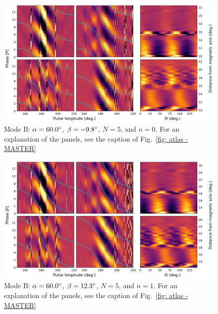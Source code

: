 \begin{figure}
	\begin{center}
		\includegraphics[width=\atlasHeightFrac\textwidth]{Figures/B0031/atlas/B_517060005000_plots}
		\caption[Atlas results: Mode B -- $\alpha=60.0\degr$, $\beta=-9.8\degr$, $N=5$, $n=0$]{Mode B: $\alpha=60.0\degr$, $\beta=-9.8\degr$, $N=5$, and $n=0$. For an explanation of the panels, see the caption of Fig.~\ref{fig: atlas - MASTER} }
		\label{fig: atlas - B_517060005000}
	\end{center}
\end{figure}

\begin{figure}
	\begin{center}
		\includegraphics[width=\atlasHeightFrac\textwidth]{Figures/B0031/atlas/B_517060005001_plots}
		\caption[Atlas results: Mode B -- $\alpha=60.0\degr$, $\beta=12.3\degr$, $N=5$, $n=1$]{Mode B: $\alpha=60.0\degr$, $\beta=12.3\degr$, $N=5$, and $n=1$. For an explanation of the panels, see the caption of Fig.~\ref{fig: atlas - MASTER} }
		\label{fig: atlas - B_517060005001}
	\end{center}
\end{figure}

